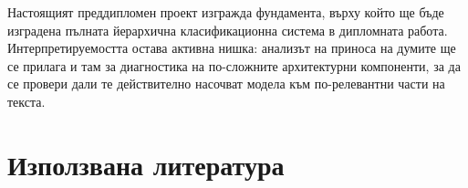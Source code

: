\documentclass[12pt,a4paper]{report}
\begin{document}
Настоящият преддипломен проект изгражда фундамента, върху който ще бъде изградена пълната йерархична класификационна система в дипломната работа. Интерпретируемостта остава активна нишка: анализът на приноса на думите ще се прилага и там за диагностика на по-сложните архитектурни компоненти, за да се провери дали те действително насочват модела към по-релевантни части на текста.


\chapter*{Използвана литература}
\printbibliography[heading=none]
\end{document}
